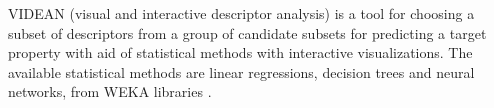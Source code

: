 VIDEAN (visual and interactive descriptor analysis) is a tool for choosing a subset of descriptors from a group of candidate subsets for predicting a target property with aid of statistical methods with interactive visualizations. The available statistical methods are linear regressions, decision trees and neural networks, from WEKA libraries \cite{Mart_nez_2015}.